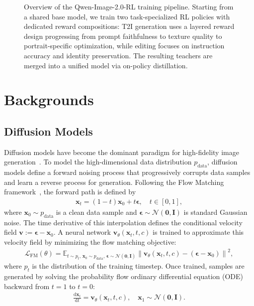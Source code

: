 \documentclass{llmxive}
\providecommand{\bm}[1]{\boldsymbol{#1}}
\providecommand{\mathbf}[1]{\bm{#1}}
\begin{document}
\begin{figure}[t]
{%
}
\caption{Overview of the Qwen-Image-2.0-RL training pipeline. Starting from a shared base model, we train two task-specialized RL policies with dedicated reward compositions: T2I generation uses a layered reward design progressing from prompt faithfulness to texture quality to portrait-specific optimization, while editing focuses on instruction accuracy and identity preservation. The resulting teachers are merged into a unified model via on-policy distillation.}
\label{fig:pipeline}
\end{figure}


\section{Backgrounds}

\subsection{Diffusion Models}
Diffusion models have become the dominant paradigm for high-fidelity image generation~\citep{sohl2015deep,ho2020denoising,song2021score,liu2022flow,lipman2022flow}. To model the high-dimensional data distribution $p_{\text{data}}$, diffusion models define a forward noising process that progressively corrupts data samples and learn a reverse process for generation. Following the Flow Matching framework~\citep{lipman2022flow,liu2022flow}, the forward path is defined by
\begin{align}
    \mathbf{x}_t=(1-t)\mathbf{x}_0+t\mathbf{\epsilon}, \quad t\in [0,1],
\end{align}
where $\mathbf{x}_0\sim p_{\text{data}}$ is a clean data sample and $\mathbf{\epsilon}\sim\mathcal{N}(\mathbf{0}, \mathbf{I})$ is standard Gaussian noise. The time derivative of this interpolation defines the conditional velocity field $ \mathbf{v} := \mathbf{\epsilon} - \mathbf{x}_0$.
A neural network $\mathbf{v}_\theta(\mathbf{x}_t, t,c)$ is trained to approximate this velocity field by minimizing the flow matching objective:
\begin{align}
    \mathcal{L}_{\text{FM}}(\theta) = \mathbb{E}_{t\sim p_t,\,\mathbf{x}_0\sim p_{\text{data}},\,\mathbf{\epsilon}\sim\mathcal{N}(\mathbf{0},\mathbf{I})} \left\| \mathbf{v}_\theta(\mathbf{x}_t, t,c) - (\mathbf{\epsilon} - \mathbf{x}_0) \right\|^2,
    \label{eq:fm_loss}
\end{align}
where $p_t$ is the distribution of the training timestep.
Once trained, samples are generated by solving the probability flow ordinary differential equation (ODE) backward from $t=1$ to $t=0$:
\begin{align}
    \frac{\mathrm{d}\mathbf{x}_t}{\mathrm{d}t} = \mathbf{v}_\theta(\mathbf{x}_t, t,c), \quad \mathbf{x}_1 \sim \mathcal{N}(\mathbf{0}, \mathbf{I}).
    \label{eq:sampling-ode}
\end{align}
\end{document}
